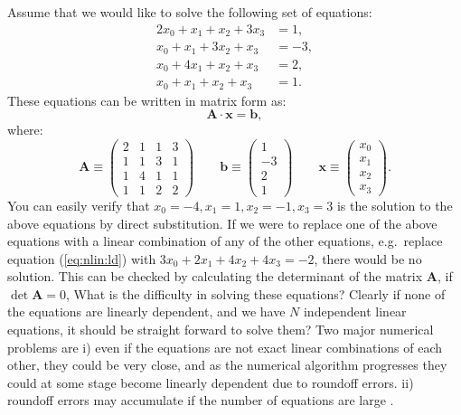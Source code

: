 \documentclass[graybox,sectrefs,envcountresetchap,open=right,final]{svmonodo}
\begin{document}
Assume that we would like to solve the following set of equations:
\begin{align}
2x_0+x_1+x_2+3x_3&=1,\label{eq:nlin:la} \\ 
x_0+x_1+3x_2+x_3&=-3,\label{eq:nlin:lb} \\ 
x_0+4x_1+x_2+x_3&=2,\label{eq:nlin:lc} \\ 
x_0+x_1+x_2+x_3&=1.\label{eq:nlin:ld} 
\end{align}
These equations can be written in matrix form as:
\begin{equation}
\mathbf{A\cdot x}=\mathbf{b},
\label{eq:nlin:mat}
\end{equation}
where:
\begin{equation}
\mathbf{A}\equiv\begin{pmatrix}
2&1&1&3\\ 
1&1&3&1\\ 
1&4&1&1\\ 
1&1&2&2
\end{pmatrix}
\qquad
\mathbf{b}\equiv
\begin{pmatrix}
1\\-3\\2\\1
\end{pmatrix}
\qquad
\mathbf{x}\equiv
\begin{pmatrix}
x_0\\x_1\\x_2\\x_3
\end{pmatrix}.
\label{eq:nlin:matA}
\end{equation}
You can easily verify that $x_0=-4, x_1=1, x_2=-1, x_3= 3$ is the solution to the above equations by direct substitution. If we were to replace one of the above equations with a linear combination of any of the other equations, e.g.~replace equation (\ref{eq:nlin:ld}) with $3x_0+2x_1+4x_2+4x_3=-2$, there would be no solution. This can be checked by calculating the determinant of the matrix $\mathbf{A}$, if $\det \mathbf{A}=0 $,  
What is the difficulty in solving these equations? Clearly if none of the equations are linearly dependent, and we have $N$ independent linear equations, it should be straight forward to solve them? Two major numerical problems are i) even if the equations are not exact linear combinations of each other, they could be very close, and as the numerical algorithm progresses they could at some stage become linearly dependent due to roundoff errors. ii) roundoff errors may accumulate if the number of equations are large \cite{press2007}.
\end{document}
